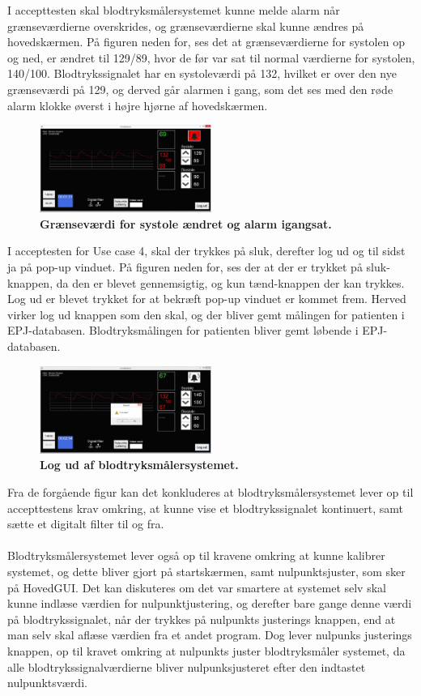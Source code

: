 I accepttesten skal blodtryksmålersystemet kunne melde alarm når grænseværdierne overskrides, og grænseværdierne skal kunne ændres på hovedskærmen. På figuren neden for, ses det at grænseværdierne for systolen op og ned, er ændret til 129/89, hvor de før var sat til normal værdierne for systolen, 140/100. Blodtrykssignalet har en systoleværdi på 132, hvilket er over den nye grænseværdi på 129, og derved går alarmen i gang, som det ses med den røde alarm klokke øverst i højre hjørne af hovedskærmen. 
\begin{figure}[H]
\includegraphics[width =0.5\textwidth , center]{billeder/IThovedGUIAlarm}
\caption{\textbf{Grænseværdi for systole ændret og alarm igangsat.}}
\end{figure}
I acceptesten for Use case 4, skal der trykkes på sluk, derefter log ud og til sidst ja på pop-up vinduet. På figuren neden for, ses der at der er trykket på sluk-knappen, da den er blevet gennemsigtig, og kun tænd-knappen der kan trykkes. Log ud er blevet trykket for at bekræft pop-up vinduet er kommet frem. Herved virker log ud knappen som den skal, og der bliver gemt målingen for patienten i EPJ-databasen. Blodtryksmålingen for patienten bliver gemt løbende i EPJ-databasen. 
\begin{figure}[H]
\includegraphics[width =0.5\textwidth , center]{billeder/IThovedGUILogUd}
\caption{\textbf{Log ud af blodtryksmålersystemet.}}
\end{figure}
Fra de forgående figur kan det konkluderes at blodtryksmålersystemet lever op til accepttestens krav omkring, at kunne vise et blodtrykssignalet kontinuert, samt sætte et digitalt filter til og fra. \\\\
Blodtryksmålersystemet lever også op til kravene omkring at kunne kalibrer systemet, og dette bliver gjort på startskærmen, samt nulpunktsjuster, som sker på HovedGUI. Det kan diskuteres om det var smartere at systemet selv skal kunne indlæse værdien for nulpunktjustering, og derefter bare gange denne værdi på blodtrykssignalet, når der trykkes på nulpunkts justerings knappen, end at man selv skal aflæse værdien fra et andet program. Dog lever nulpunks justerings knappen, op til kravet omkring at nulpunkts juster blodtryksmåler systemet, da alle blodtrykssignalværdierne bliver nulpunksjusteret efter den indtastet nulpunktsværdi. \\\\
